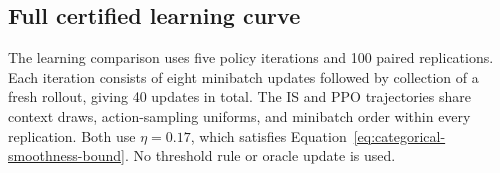\subsection{Full certified learning curve}

The learning comparison uses five policy iterations and 100 paired replications. Each iteration consists of eight minibatch updates followed by collection of a fresh rollout, giving 40 updates in total. The IS and PPO trajectories share context draws, action-sampling uniforms, and minibatch order within every replication. Both use $\eta=0.17$, which satisfies Equation~\eqref{eq:categorical-smoothness-bound}. No threshold rule or oracle update is used.
